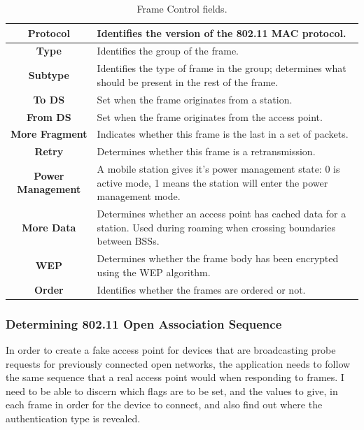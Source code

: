 \begin{table}[!h]
\begin{center}
	\begin{tabular}{ | c |  p{10cm} | }
 		\hline
		\textbf{Protocol} & Identifies the version of the 802.11 MAC protocol. \\ \hline
		\textbf{Type} & Identifies the group of the frame. \\ \hline
		\textbf{Subtype} & Identifies the type of frame in the group; determines what should be present in the rest of the frame. \\ \hline
		\textbf{To DS} & Set when the frame originates from a station. \\ \hline
		\textbf{From DS} & Set when the frame originates from the access point. \\ \hline
		\textbf{More Fragment} & Indicates whether this frame is the last in a set of packets. \\ \hline
		\textbf{Retry} & Determines whether this frame is a retransmission. \\ \hline
		\textbf{Power Management} & A mobile station gives it’s power management state: 0 is active mode, 1  means the station will enter the power management mode. \\ \hline
		\textbf{More Data} & Determines whether an access point has cached data for a station. Used during roaming when crossing boundaries between BSSs. \\ \hline
		\textbf{WEP} & Determines whether the frame body has been encrypted using the WEP \cite{research:wep} algorithm.  \\ \hline
		\textbf{Order} & Identifies whether the frames are ordered or not. \\ \hline
	\end{tabular}
		\caption{Frame Control fields.}
		\label{table:framecontrol}
\end{center}
\end{table}
\clearpage
\subsubsection{Determining 802.11 Open Association Sequence}
\label{research:assoc-seq}
In order to create a fake access point for devices that are broadcasting probe requests for previously connected open networks, the application needs to follow the same sequence that a real access point would when responding to frames. I need to be able to discern which flags are to be set, and the values to give, in each frame in order for the device to connect, and also find out where the authentication type is revealed. 

